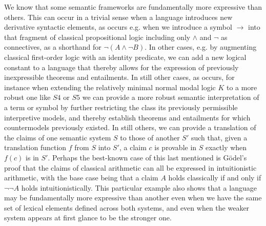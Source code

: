 \documentclass[]{article}
\begin{document}
We know that some semantic frameworks are fundamentally more expressive than others. 
This can occur in a trivial sense when a language introduces new derivative syntactic elements, 
as occurs e.g. when we introduce a symbol $\rightarrow$ into that fragment of classical propositional logic including only $\wedge $ and $\neg$ as connectives, 
as a shorthand for $\neg(A \wedge \neg B)$. 
In other cases, e.g. by augmenting classical first-order logic with an identity predicate, 
we can add a new logical constant to a language that thereby allows for the expression of previously inexpressible theorems and entailments. 
In still other cases, 
as occurs, for instance when extending the relatively minimal normal modal logic $K$ to a more robust one like $S4$ or $S5$
we can provide a more robust semantic interpretation of a term or symbol by further restricting the class its previously permissible interpretive models, 
and thereby establish theorems and entailments for which countermodels previously existed.
In still others, we can provide a translation of the claims of one semantic system $S$ to those of another $S'$ 
such that, 
given a translation function $f$ from $S$ into $S'$, 
a claim $c$ is provable in $S$ exactly when  $f(c)$ is in $S'$.
Perhaps the best-known case of this last mentioned is G\"{o}del's proof that the claims of classical arithmetic can all be expressed in intuitionistic arithmetic, 
with the base case being that a claim $A$ holds classically if and only if $\neg\neg A$ holds intuitionistically. 
This particular example also shows that a language may be fundamentally more expressive than another even when we have the same set of lexical elements defined across both systems, 
and even when the weaker system appears at first glance to be the stronger one. 
\end{document}
